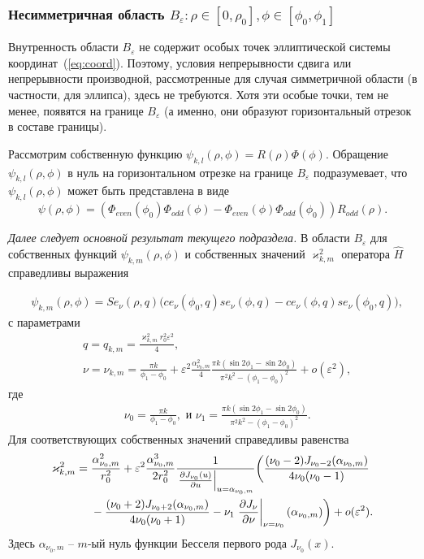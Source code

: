 \subsubsection{Несимметричная область $B_\varepsilon:  \rho \in [0, \rho_0], \phi \in [\phi_0, \phi_1 ]$}\label{sec:ch2/sec2/sub2/sub2}

Внутренность области $B_\varepsilon$ не содержит особых точек эллиптической системы координат~(\ref{eq:coord}). Поэтому, условия непрерывности сдвига или непрерывности производной, рассмотренные для случая симметричной области (в частности, для эллипса), здесь не требуются.
Хотя эти особые точки, тем не менее, появятся на границе  $B_\varepsilon$ (а именно, они образуют горизонтальный отрезок в составе границы).

Рассмотрим собственную функцию $\psi_{k,l}(\rho,\phi) = R(\rho)\Phi(\phi)$.
Обращение  $\psi_{k,l}(\rho,\phi) $ в нуль на горизонтальном отрезке на границе  $B_\varepsilon$
подразумевает, что $\psi_{k,l}(\rho,\phi)$ может быть представлена в виде
\[
\psi(\rho,\phi) = 
    \left(
    \Phi_{even}(\phi_0) \Phi_{odd}(\phi) - \Phi_{even}(\phi) \Phi_{odd}(\phi_0) 
    \right) R_{odd}(\rho).
\]

{\em Далее следует основной результат текущего подраздела.}
В области  $B_\varepsilon$ для собственных функций $\psi_{k, m}(\rho, \phi)$ и собственных значений $\varkappa^2_{k, m}$ оператора $\hat{H}$ справедливы выражения

\begin{align}
&\psi_{k, m}(\rho, \phi) = 
    Se_\nu(\rho, q) \biggl( ce_\nu(\phi_0, q) se_\nu(\phi, q) -ce_\nu(\phi, q) se_\nu(\phi_0, q) \biggr) ,  \label{eq:funB}
\end{align}
с параметрами
\begin{align*}    
    & q=q_{k,m} = \frac{\varkappa_{k,m}^2 r_0^2 \varepsilon^2}{4}, \\ 
&\nu = \nu_{k,m} = \frac{\pi k}{\phi_1-\phi_0} +\varepsilon^2 \frac{\alpha_{\nu_0, m}^2}{4} \frac{\pi k (\sin 2\phi_1 - \sin 2 \phi_0)}{\pi^2k^2-(\phi_1-\phi_0)^2} + o(\varepsilon^2) ,  
\end{align*}
где
\begin{align*}
& \nu_0 = \frac{\pi k}{\phi_1-\phi_0},\text{\ \ и \ \ }
\nu_1= \frac{\pi k (\sin 2\phi_1 - \sin 2 \phi_0)}{\pi^2k^2-(\phi_1-\phi_0)^2} .
\end{align*}
Для соответствующих собственных значений справедливы равенства
\begin{align}
\varkappa_{k, m}^2 ={}& \frac{\alpha_{\nu_0, m}^2}{r_0^2} +  \varepsilon^2 \frac{\alpha_{\nu_0, m}^3}{2 r_0^2}\frac{1}{ \left.\frac{\partial J_{\nu_0}(u)}{\partial u}\right|_{u=\alpha_{\nu_0, m}} }  
 \biggl(\frac{(\nu_0 - 2)J_{\nu_0-2}(\alpha_{\nu_0, m})   }{4\nu_0 (\nu_0-1)} 
\notag \\ 
&{}- \frac{(\nu_0 + 2)J_{\nu_0+2}(\alpha_{\nu_0, m})}{4\nu_0 (\nu_0+1)} 
- \nu_1 \left.\frac{\partial J_\nu}{\partial \nu}\right|_{\nu = \nu_0}(\alpha_{\nu_0, m})
    \biggr) + o(\varepsilon^2).\label{eq:valB}
\end{align}
Здесь $\alpha_{\nu_0,m}$ -- $m$-ый нуль функции Бесселя первого рода $J_{\nu_0}(x)$.



